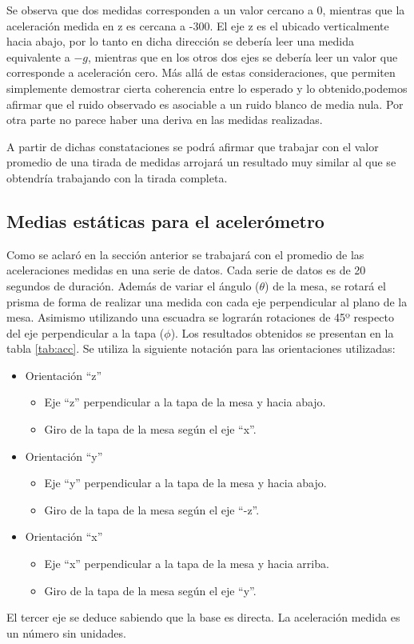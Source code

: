 \documentclass[spanish,12pt,a4paper,titlepage]{report}
\begin{document}
Se observa que dos medidas corresponden a un valor cercano a 0, mientras que la aceleración medida en z es cercana a -300. El eje z es el ubicado verticalmente hacia abajo, por lo tanto en dicha dirección se debería leer una medida equivalente a $-g$, mientras que en los otros dos ejes se debería leer un valor que corresponde a aceleración cero. Más allá de estas consideraciones, que permiten simplemente demostrar cierta coherencia entre lo esperado y lo obtenido,podemos afirmar que el ruido observado es asociable a un ruido blanco de media nula. Por otra parte no parece haber una deriva en las medidas realizadas. 

A partir de dichas constataciones se podrá afirmar que trabajar con el valor promedio de una tirada de medidas arrojará un resultado muy similar al que se obtendría trabajando con la tirada completa. 


\subsection{Medias estáticas para el acelerómetro}

Como se aclaró en la sección anterior se trabajará con el promedio de las aceleraciones medidas en una serie de datos. Cada serie de datos es de 20 segundos de duración. Además de variar el ángulo ($\theta$) de la mesa, se rotará el prisma de forma de realizar una medida con cada eje perpendicular al plano de la mesa. Asimismo utilizando una escuadra se lograrán rotaciones de 45º respecto del eje perpendicular a la tapa ($\phi$). Los resultados obtenidos se presentan en la tabla \ref{tab:acc}. Se utiliza la siguiente notación para las orientaciones utilizadas:
\begin{itemize}
	\item Orientación ``z''
	\begin{itemize}
		\item Eje ``z'' perpendicular a la tapa de la mesa y hacia abajo.
		\item Giro de la tapa de la mesa según el eje ``x''.
	\end{itemize}
	\item Orientación ``y''
	\begin{itemize}
		\item Eje ``y'' perpendicular a la tapa de la mesa y hacia abajo.
		\item Giro de la tapa de la mesa según el eje ``-z''.
	\end{itemize}
	\item Orientación ``x''
	\begin{itemize}
		\item Eje ``x'' perpendicular a la tapa de la mesa y hacia arriba.
		\item Giro de la tapa de la mesa según el eje ``y''.
	\end{itemize}
\end{itemize}
El tercer eje se deduce sabiendo que la base es directa. La aceleración medida es un número sin unidades.
\end{document}
